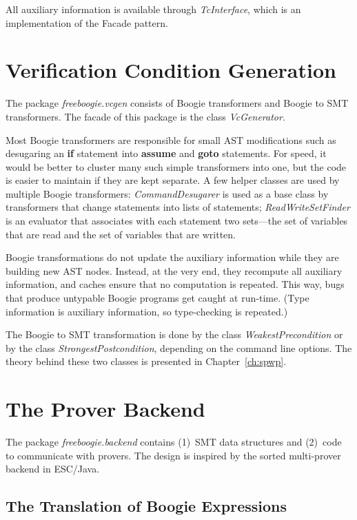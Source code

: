 \documentclass{llncs}
\newcommand{\escjava}{ESC\slash Java\xspace}
\begin{document}
All auxiliary information is available through
\textit{TcInterface}, which is an implementation of the Facade
pattern.

\section{Verification Condition Generation} %

The package \textit{freeboogie.vcgen} consists of Boogie
transformers and Boogie to SMT transformers. The facade of this
package is the class \textit{VcGenerator}.

Most Boogie transformers are responsible for small AST
modifications such as desugaring an \textbf{if} statement
into \textbf{assume} and \textbf{goto} statements. For speed,
it would be better to cluster many such simple transformers
into one, but the code is easier to maintain if they are kept
separate. A few helper classes are used by multiple Boogie
transformers: \textit{CommandDesugarer} is used as a base class
by transformers that change statements into lists of statements;
\textit{ReadWriteSetFinder} is an evaluator that associates with
each statement two sets---the set of variables that are read and
the set of variables that are written.

Boogie transformations do not update the auxiliary information
while they are building new AST nodes. Instead, at the very end,
they recompute all auxiliary information, and caches ensure that
no computation is repeated. This way, bugs that produce untypable
Boogie programs get caught at run-time. (Type information is
auxiliary information, so type-checking is repeated.)

The Boogie to SMT transformation is done by the
class \textit{WeakestPrecondition} or by the class
\textit{StrongestPostcondition}, depending on the command line
options. The theory behind these two classes is presented in
Chapter~\ref{ch:spwp}.

\section{The Prover Backend} %
\label{sec:design.backend}

The package \textit{freeboogie.backend} contains (1)~SMT data
structures and (2)~code to communicate with provers. The design
is inspired by the sorted multi-prover backend in \escjava.

\subsection{The Translation of Boogie Expressions} %
\end{document}
